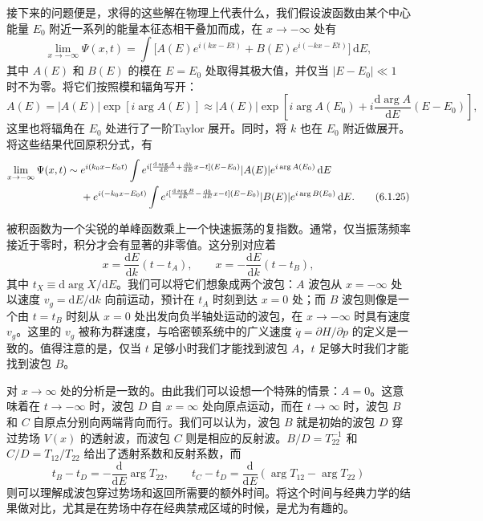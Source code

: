 接下来的问题便是，求得的这些解在物理上代表什么，我们假设波函数由某个中心能量 $E_0$ 附近一系列的能量本征态相干叠加而成，在 $x\to-\infty$ 处有
\begin{equation}
 \lim_{x\to-\infty}\Psi(x,t)=\int\bigl[A(E)e^{i(kx-Et)}+B(E)e^{i(-kx-Et)}\bigr]\,\mathrm dE,
\tag{6.1.24}
\end{equation}
其中 $A(E)$ 和 $B(E)$ 的模在 $E=E_0$ 处取得其极大值，并仅当 $|E-E_0|\ll1$ 时不为零。将它们按照模和辐角写开：
\[
 A(E)=|A(E)|\exp[i\arg A(E)]
 \approx |A(E)|\exp\left[i\arg A(E_0)+i\frac{\mathrm d\arg A}{\mathrm dE}(E-E_0)\right],
\]
这里也将辐角在 $E_0$ 处进行了一阶Taylor 展开。同时，将 $k$ 也在 $E_0$ 附近做展开。将这些结果代回原积分式，有
\begin{align}
 \lim_{x\to-\infty}\Psi(x,t)\sim{}&e^{i(k_0x-E_0t)}\int e^{i[\frac{\mathrm d\arg A}{\mathrm dE}+\frac{\mathrm dk}{\mathrm dE}x-t](E-E_0)}|A(E)|e^{i\arg A(E_0)}\,\mathrm dE\notag\\
 &+e^{i(-k_0x-E_0t)}\int e^{i[\frac{\mathrm d\arg B}{\mathrm dE}-\frac{\mathrm dk}{\mathrm dE}x-t](E-E_0)}|B(E)|e^{i\arg B(E_0)}\,\mathrm dE.
\tag{6.1.25}
\end{align}

被积函数为一个尖锐的单峰函数乘上一个快速振荡的复指数。通常，仅当振荡频率接近于零时，积分才会有显著的非零值。这分别对应着
\begin{equation}
 x=\frac{\mathrm dE}{\mathrm dk}(t-t_A),\qquad
 x=-\frac{\mathrm dE}{\mathrm dk}(t-t_B),
\tag{6.1.26}
\end{equation}
其中 $t_X\equiv\mathrm d\arg X/\mathrm dE$。我们可以将它们想象成两个波包：$A$ 波包从 $x=-\infty$ 处以速度 $v_g=\mathrm dE/\mathrm dk$ 向前运动，预计在 $t_A$ 时刻到达 $x=0$ 处；而 $B$ 波包则像是一个由 $t=t_B$ 时刻从 $x=0$ 处出发向负半轴处运动的波包，在 $x\to-\infty$ 时具有速度 $v_g$。这里的 $v_g$ 被称为群速度，与哈密顿系统中的广义速度 $\dot q=\partial H/\partial p$ 的定义是一致的。值得注意的是，仅当 $t$ 足够小时我们才能找到波包 $A$，$t$ 足够大时我们才能找到波包 $B$。

对 $x\to\infty$ 处的分析是一致的。由此我们可以设想一个特殊的情景：$A=0$。这意味着在 $t\to-\infty$ 时，波包 $D$ 自 $x=\infty$ 处向原点运动，而在 $t\to\infty$ 时，波包 $B$ 和 $C$ 自原点分别向两端背向而行。我们可以认为，波包 $B$ 就是初始的波包 $D$ 穿过势场 $V(x)$ 的透射波，而波包 $C$ 则是相应的反射波。$B/D=T_{22}^{-1}$ 和 $C/D=T_{12}/T_{22}$ 给出了透射系数和反射系数，而
\begin{equation}
 t_B-t_D=-\frac{\mathrm d}{\mathrm dE}\arg T_{22},\qquad
 t_C-t_D=\frac{\mathrm d}{\mathrm dE}(\arg T_{12}-\arg T_{22})
\tag{6.1.27}
\end{equation}
则可以理解成波包穿过势场和返回所需要的额外时间。将这个时间与经典力学的结果做对比，尤其是在势场中存在经典禁戒区域的时候，是尤为有趣的。

